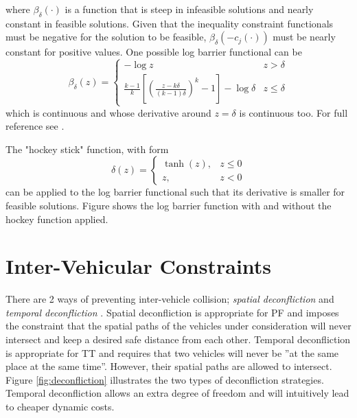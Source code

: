 where $\beta_\delta(\cdot)$ is a function that is steep in infeasible solutions and nearly constant in feasible solutions. Given that the inequality constraint functionals must be negative for the solution to be feasible, $\beta_\delta(-c_j(\cdot))$ must be nearly constant for positive values. One possible log barrier functional can be
\begin{equation}
    \beta_\delta (z) = 
    \begin{cases}
        -\log{} z & z>\delta \\
        \frac{k-1}{k}\left[\left(\frac{z-k\delta}{(k-1)\delta}\right)^k-1\right]-\log{}\delta & z\leq \delta
    \end{cases}
\end{equation}
which is continuous and whose derivative around $z=\delta$ is continuous too. For full reference see \cite{hauser2006barrie}.
\par The "hockey stick" function, with form
\begin{equation}
    \delta(z)= \begin{cases}
        \tanh(z), & z\leq 0 \\
        z, & z<0
    \end{cases}
\end{equation}
can be applied to the log barrier functional such that its derivative is smaller for feasible solutions. Figure  shows the log barrier function with and without the hockey function applied.

\section{Inter-Vehicular Constraints}

\par There are 2 ways of preventing inter-vehicle collision; \textit{spatial deconfliction} and \textit{temporal deconfliction} \cite{hausler2015mission}.
Spatial deconfliction is appropriate for \ac{PF} and imposes the constraint that the spatial paths of the vehicles under consideration will never intersect and keep a desired safe distance from each other. Temporal deconfliction is appropriate for \ac{TT} and requires that two vehicles will never be ”at the same place at the same time”. However, their spatial paths are allowed to intersect. Figure \ref{fig:deconfliction} illustrates the two types of deconfliction strategies. Temporal deconfliction allows an extra degree of freedom and will intuitively lead to cheaper dynamic costs.

